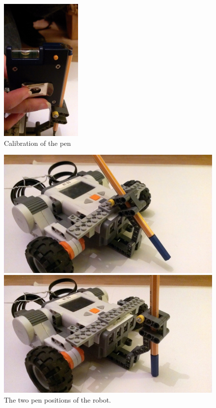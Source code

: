 \documentclass{scrartcl}
\begin{document}
\begin{figure}
 \center
 \includegraphics[width= 4cm]{img/pen_adjust.jpg}
 \caption{Calibration of the pen}
 \label{fig:pen_calib}
\end{figure}


\begin{figure}
\centering
\begin{minipage}{.5\textwidth}
  \centering
  \includegraphics[width=.8\linewidth]{img/pen_up.jpg}
\end{minipage}%
\begin{minipage}{.5\textwidth}
  \centering
  \includegraphics[width=.8\linewidth]{img/pen_down.jpg}
  
\end{minipage}
\caption{The two pen positions of the robot.}
\label{fig:pen_position}
\end{figure}
\end{document}
